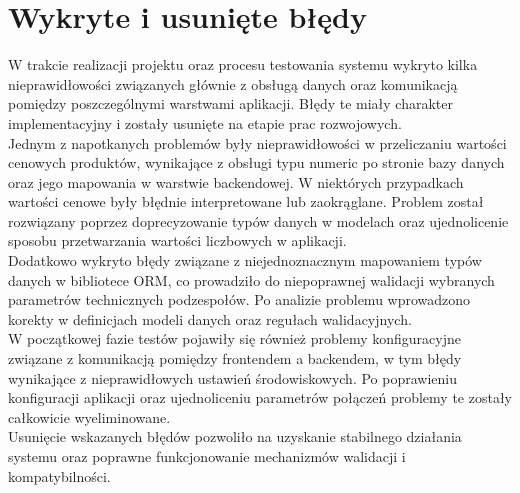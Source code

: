 \documentclass[a4paper,twoside,12pt]{book}
\begin{document}
\section{Wykryte i usunięte błędy}
W trakcie realizacji projektu oraz procesu testowania systemu wykryto kilka
nieprawidłowości związanych głównie z obsługą danych oraz komunikacją pomiędzy
poszczególnymi warstwami aplikacji. Błędy te miały charakter implementacyjny i
zostały usunięte na etapie prac rozwojowych.
\vspace{0.5cm}
\\
Jednym z napotkanych problemów były nieprawidłowości w przeliczaniu wartości
cenowych produktów, wynikające z obsługi typu numeric po stronie bazy
danych oraz jego mapowania w warstwie backendowej. W niektórych przypadkach
wartości cenowe były błędnie interpretowane lub zaokrąglane. Problem został
rozwiązany poprzez doprecyzowanie typów danych w modelach oraz ujednolicenie
sposobu przetwarzania wartości liczbowych w aplikacji.
\vspace{0.5cm}
\\
Dodatkowo wykryto błędy związane z niejednoznacznym mapowaniem typów danych w
bibliotece ORM, co prowadziło do niepoprawnej walidacji wybranych parametrów
technicznych podzespołów. Po analizie problemu wprowadzono korekty w definicjach
modeli danych oraz regułach walidacyjnych.
\vspace{0.5cm}
\\
W początkowej fazie testów pojawiły się również problemy konfiguracyjne związane
z komunikacją pomiędzy frontendem a backendem, w tym błędy wynikające z
nieprawidłowych ustawień środowiskowych. Po poprawieniu konfiguracji aplikacji
oraz ujednoliceniu parametrów połączeń problemy te zostały całkowicie
wyeliminowane.
\vspace{0.5cm}
\\
Usunięcie wskazanych błędów pozwoliło na uzyskanie stabilnego działania systemu
oraz poprawne funkcjonowanie mechanizmów walidacji i kompatybilności.
\end{document}

